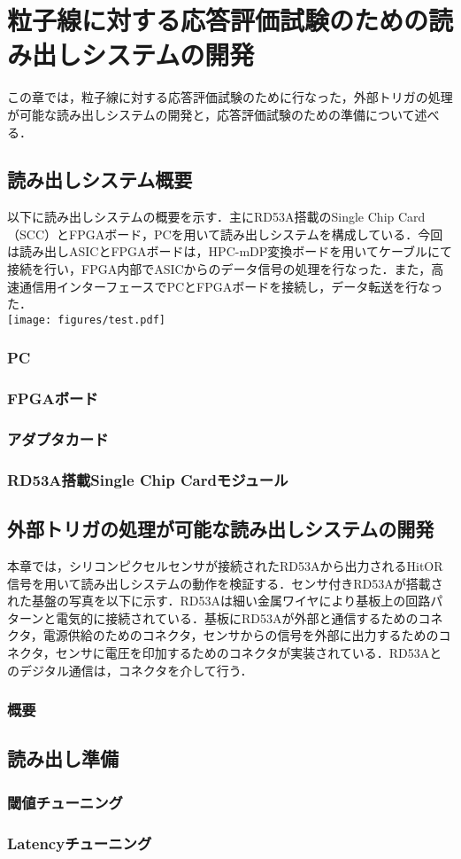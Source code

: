 \chapter{粒子線に対する応答評価試験のための読み出しシステムの開発}
この章では，粒子線に対する応答評価試験のために行なった，外部トリガの処理が可能な読み出しシステムの開発と，応答評価試験のための準備について述べる．

\section{読み出しシステム概要}
以下に読み出しシステムの概要を示す．主にRD53A搭載のSingle Chip Card（SCC）とFPGAボード，PCを用いて読み出しシステムを構成している．今回は読み出しASICとFPGAボードは，HPC-mDP変換ボードを用いてケーブルにて接続を行い，FPGA内部でASICからのデータ信号の処理を行なった．また，高速通信用インターフェースでPCとFPGAボードを接続し，データ転送を行なった．\\

\texttt{[image: figures/test.pdf]}


\subsection{PC}
\subsection{FPGAボード}
\subsection{アダプタカード}
\subsection{RD53A搭載Single Chip Cardモジュール}

\section{外部トリガの処理が可能な読み出しシステムの開発}
本章では，シリコンピクセルセンサが接続されたRD53Aから出力されるHitOR信号を用いて読み出しシステムの動作を検証する．センサ付きRD53Aが搭載された基盤の写真を以下に示す．RD53Aは細い金属ワイヤにより基板上の回路パターンと電気的に接続されている．基板にRD53Aが外部と通信するためのコネクタ，電源供給のためのコネクタ，センサからの信号を外部に出力するためのコネクタ，センサに電圧を印加するためのコネクタが実装されている．RD53Aとのデジタル通信は，コネクタを介して行う．

\subsection{概要}



\section{読み出し準備}
\subsection{閾値チューニング}
\subsection{Latencyチューニング}


